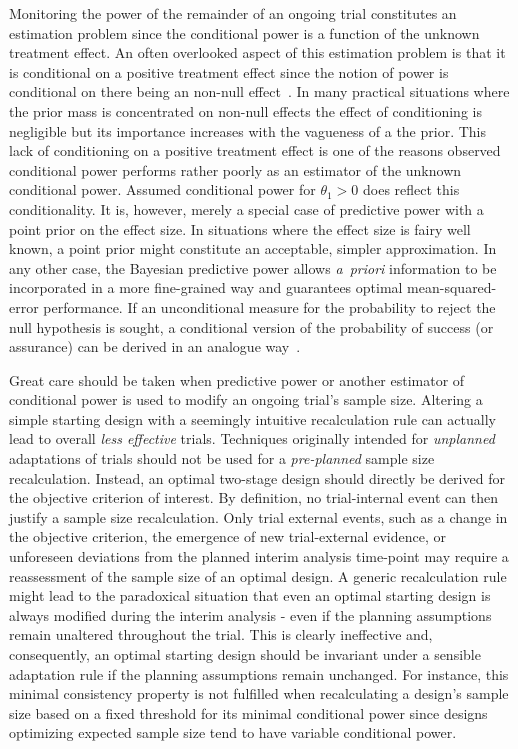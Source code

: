 \documentclass[12pt]{article}
\begin{document}
Monitoring the power of the remainder of an ongoing trial constitutes an estimation problem since the conditional power
is a function of the unknown treatment effect.
An often overlooked aspect of this estimation problem is that it is
conditional on a positive treatment effect since the notion of power is conditional on there being an non-null effect~\cite{kunzmann2020}.
In many practical situations where the prior mass is concentrated on
non-null effects the effect of conditioning is negligible but its importance increases with the vagueness of a the prior.
This lack of conditioning on a positive treatment effect is one of the reasons observed conditional power performs rather poorly as an estimator of the unknown conditional power.
Assumed conditional power for $\theta_1>0$ does reflect this conditionality.
It is, however,
merely a special case of predictive power with a
point prior on the effect size.
In situations where the effect size is fairy well known, a point prior might constitute an acceptable, simpler approximation.
In any other case, the Bayesian predictive power allows \textit{a~priori} information to be incorporated in a more fine-grained way and
guarantees optimal mean-squared-error performance.
If an unconditional measure for the probability to reject the null hypothesis is sought,
a conditional version of the probability of success (or assurance) can be derived in an analogue way~\cite{kunzmann2020}.

Great care should be taken when predictive power
or another estimator of conditional power
is used to modify an ongoing trial's sample size.
Altering a simple starting design with a seemingly intuitive recalculation rule
can actually lead to overall \emph{less effective} trials.
Techniques originally intended for \emph{unplanned} adaptations of trials
should not be used for a \emph{pre-planned} sample size recalculation.
Instead, an optimal two-stage design should directly be derived
for the objective criterion of interest.
By definition, no trial-internal event can then justify a sample size recalculation.
Only trial external events, such as a change in the objective criterion,
the emergence of new trial-external evidence,
or unforeseen deviations from the planned interim analysis time-point
may require a reassessment of the sample size of an optimal design.
A generic recalculation rule might lead to the paradoxical situation that even an optimal
starting design is always modified during the interim analysis
- even if the planning assumptions remain unaltered throughout the trial.
This is clearly ineffective and, consequently,
an optimal starting design should be invariant under a sensible adaptation rule
if the planning assumptions remain unchanged.
For instance, this minimal consistency property is not fulfilled when recalculating a design's
sample size based on a fixed threshold for its minimal conditional power
since designs optimizing expected sample size tend to have variable conditional power.
\end{document}
